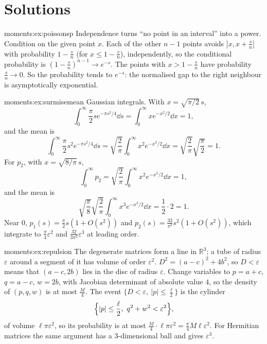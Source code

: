 \section{Solutions}



\begin{solution}{moments:ex:poissonsp}
\idea Independence turns ``no point in an interval'' into a power.
\writeup Condition on the given point $x$. Each of the other $n-1$ points avoids $]x,x+\frac sn]$ with probability $1-\frac sn$ (for $x\le1-\frac sn$), independently,
so the conditional probability is $(1-\frac sn)^{n-1}\to e^{-s}$. The points with $x>1-\frac sn$ have probability $\frac sn\to0$. So the probability tends to $e^{-s}$:
the normalised gap to the right neighbour is asymptotically exponential.
\end{solution}

\begin{solution}{moments:ex:surmisemean}
\idea Gaussian integrals.
\writeup With $x=\sqrt{\pi/2}\,s$,
\[
\int_0^\infty\frac\pi2se^{-\pi s^2/4}\dd s=\int_0^\infty xe^{-x^2/2}\dd x=1,
\]
and the mean is
\[
\int_0^\infty\frac\pi2s^2e^{-\pi s^2/4}\dd s=\sqrt{\frac2\pi}\int_0^\infty x^2e^{-x^2/2}\dd x=\sqrt{\frac2\pi}\sqrt{\frac\pi2}=1.
\]
For $p_2$, with $x=\sqrt{8/\pi}\,s$,
\[
\int_0^\infty p_2=\sqrt{\frac2\pi}\int_0^\infty x^2e^{-x^2/2}\dd x=1,
\]
and the mean is
\[
\sqrt{\frac\pi8}\sqrt{\frac2\pi}\int_0^\infty x^3e^{-x^2/2}\dd x=\frac12\cdot2=1.
\]
Near $0$,
$p_1(s)=\frac\pi2s(1+O(s^2))$ and $p_2(s)=\frac{32}{\pi^2}s^2(1+O(s^2))$, which integrate to $\frac\pi4\varepsilon^2$ and $\frac{32}{3\pi^2}\varepsilon^3$ at leading order.
\end{solution}

\begin{solution}{moments:ex:repulsion}
\idea The degenerate matrices form a line in $\mathbb R^3$; a tube of radius $\varepsilon$ around a segment of it has volume of order $\varepsilon^2$.
\writeup $D^2=(a-c)^2+4b^2$, so $D<\varepsilon$ means that $(a-c,2b)$ lies in the disc of radius $\varepsilon$. Change variables to $p=a+c$, $q=a-c$, $w=2b$, with Jacobian
determinant of absolute value $4$, so the density of $(p,q,w)$ is at most $\frac M4$. The event $\{D<\varepsilon,\ |p|\le\frac\ell2\}$ is the cylinder
\[
\Bigl\{|p|\le\frac\ell2,\ q^2+w^2<\varepsilon^2\Bigr\},
\]
of volume $\ell\pi\varepsilon^2$, so its probability is at most
$\frac M4\cdot\ell\pi\varepsilon^2=\frac\pi4M\ell\varepsilon^2$. For Hermitian matrices the same argument has a $3$-dimensional ball and gives
$\varepsilon^3$.
\end{solution}

